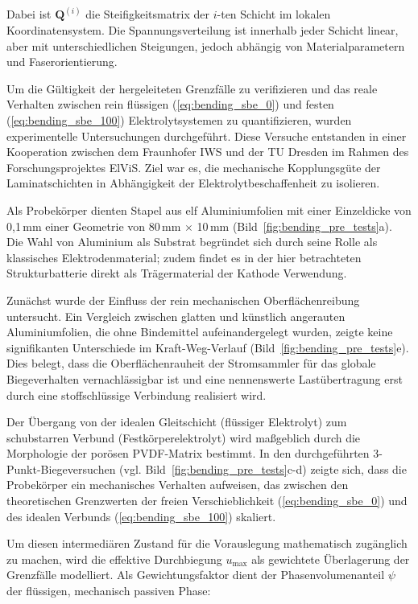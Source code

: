 Dabei ist $\mathbf{Q}^{(i)}$ die Steifigkeitsmatrix der $i$-ten Schicht im lokalen Koordinatensystem. Die Spannungsverteilung ist innerhalb jeder Schicht linear, aber mit unterschiedlichen Steigungen, jedoch abhängig von Materialparametern und Faserorientierung.

Um die Gültigkeit der hergeleiteten Grenzfälle zu verifizieren und das reale Verhalten zwischen rein flüssigen (\ref{eq:bending_sbe_0}) und festen (\ref{eq:bending_sbe_100}) Elektrolytsystemen zu quantifizieren, wurden experimentelle Untersuchungen durchgeführt. Diese Versuche entstanden in einer Kooperation zwischen dem Fraunhofer IWS und der TU Dresden im Rahmen des Forschungsprojektes ElViS. Ziel war es, die mechanische Kopplungsgüte der Laminatschichten in Abhängigkeit der Elektrolytbeschaffenheit zu isolieren.

Als Probekörper dienten Stapel aus elf Aluminiumfolien mit einer Einzeldicke von 0,1\,mm einer Geometrie von 80\,mm $\times$ 10\,mm (Bild~\ref{fig:bending_pre_tests}a). Die Wahl von Aluminium als Substrat begründet sich durch seine Rolle als klassisches Elektrodenmaterial; zudem findet es in der hier betrachteten Strukturbatterie direkt als Trägermaterial der Kathode Verwendung.

Zunächst wurde der Einfluss der rein mechanischen Oberflächenreibung untersucht. Ein Vergleich zwischen glatten und künstlich angerauten Aluminiumfolien, die ohne Bindemittel aufeinandergelegt wurden, zeigte keine signifikanten Unterschiede im Kraft-Weg-Verlauf (Bild~\ref{fig:bending_pre_tests}e). Dies belegt, dass die Oberflächenrauheit der Stromsammler für das globale Biegeverhalten vernachlässigbar ist und eine nennenswerte Lastübertragung erst durch eine stoffschlüssige Verbindung realisiert wird.

Der Übergang von der idealen Gleitschicht (flüssiger Elektrolyt) zum schubstarren Verbund (Festkörperelektrolyt) wird maßgeblich durch die Morphologie der porösen PVDF-Matrix bestimmt. In den durchgeführten 3-Punkt-Biegeversuchen (vgl. Bild~\ref{fig:bending_pre_tests}c-d) zeigte sich, dass die Probekörper ein mechanisches Verhalten aufweisen, das zwischen den theoretischen Grenzwerten der freien Verschieblichkeit (\ref{eq:bending_sbe_0}) und des idealen Verbunds (\ref{eq:bending_sbe_100}) skaliert.

Um diesen intermediären Zustand für die Vorauslegung mathematisch zugänglich zu machen, wird die effektive Durchbiegung $u_{\text{max}}$ als gewichtete Überlagerung der Grenzfälle modelliert. Als Gewichtungsfaktor dient der Phasenvolumenanteil $\psi$ der flüssigen, mechanisch passiven Phase:

